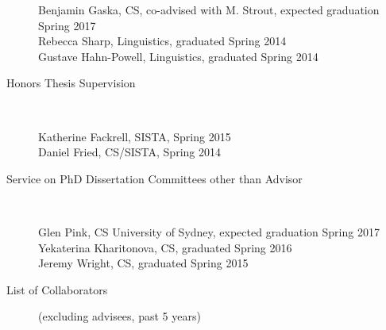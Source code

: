 \documentclass[10pt]{article}
\begin{document}
\begin{description}
Benjamin Gaska, CS, co-advised with M. Strout, expected graduation Spring 2017\\
Rebecca Sharp, Linguistics, graduated Spring 2014 \\
Gustave Hahn-Powell, Linguistics, graduated Spring 2014 

\vspace{-.1cm}\item [Honors Thesis Supervision ]\

Katherine Fackrell, SISTA, Spring 2015 \\
Daniel Fried, CS/SISTA, Spring 2014

\vspace{-.1cm}\item [Service on PhD Dissertation Committees other than Advisor ]\

Glen Pink, CS University of Sydney, expected graduation Spring 2017 \\
Yekaterina Kharitonova, CS, graduated Spring 2016 \\
Jeremy Wright, CS, graduated Spring 2015 

\newpage
\vspace{-.1cm}\item [List of Collaborators ] (excluding advisees, past 5 years)\


\end{description}
\end{document}
